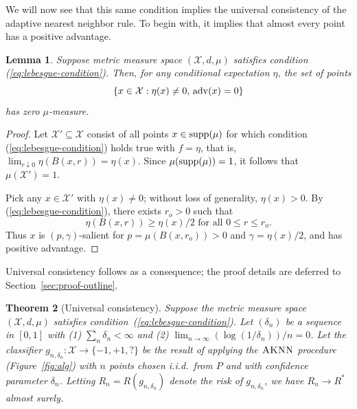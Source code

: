 \documentclass{article}
\def\X{{\mathcal X}}
\def\supp{{\rm supp}}
\def\adv{{\rm adv}}
\newcommand{\algname}{\textsc{AKNN}}
\newtheorem{theorem}{Theorem}
\newtheorem{lemma}[theorem]{Lemma}
\begin{document}
We will now see that this same condition implies the universal consistency of the adaptive nearest neighbor rule. To begin with, it implies that almost every point has a positive advantage.
\begin{lemma}
Suppose metric measure space $(\X, d, \mu)$ satisfies condition (\ref{eq:lebesgue-condition}). Then, for any conditional expectation $\eta$, the set of points
$$ \{x \in \X: \eta(x) \neq 0, \, \adv(x) = 0\}$$
has zero $\mu$-measure.
\label{lemma:positive-advantage}
\end{lemma}
\begin{proof}
Let $\X' \subseteq \X$ consist of all points $x \in \supp(\mu)$ for which condition (\ref{eq:lebesgue-condition}) holds true with $f=\eta$, that is, $\lim_{r \downarrow 0} \eta(B(x,r)) = \eta(x)$. 
Since $\mu(\supp(\mu))=1$, it follows that $\mu(\X') = 1$. 

Pick any $x \in \X'$ with $\eta(x) \neq 0$; without loss of generality, $\eta(x) > 0$. By (\ref{eq:lebesgue-condition}), there exists $r_o > 0$ such that
$$\eta(B(x,r)) \geq \eta(x)/2 \mbox{\  for all \ } 0 \leq r \leq r_o.$$
Thus $x$ is $(p,\gamma)$-salient for $p = \mu(B(x,r_o)) > 0$ and $\gamma = \eta(x)/2$, and has positive advantage.
\end{proof}

Universal consistency follows as a consequence; the proof details are deferred to Section~\ref{sec:proof-outline}.
\begin{theorem}[Universal consistency]
Suppose the metric measure space $(\X, d, \mu)$ satisfies condition~(\ref{eq:lebesgue-condition}). Let $(\delta_n)$ be a sequence in $[0,1]$ with (1) $\sum_n \delta_n < \infty$ and (2) $\lim_{n \rightarrow \infty} (\log (1/\delta_n))/n = 0$. Let the classifier $g_{n, \delta_n}: \X \rightarrow \{-1,+1,?\}$ be the result of applying the $\algname$ procedure (Figure~\ref{fig:alg}) with $n$ points chosen i.i.d.\ from $P$ and with confidence parameter $\delta_n$. Letting $R_n = R(g_{n,\delta_n})$ denote the risk of $g_{n,\delta_n}$, we have $R_n \rightarrow R^*$ almost surely.
\label{thm:universal-consistency}
\end{theorem}
\end{document}
